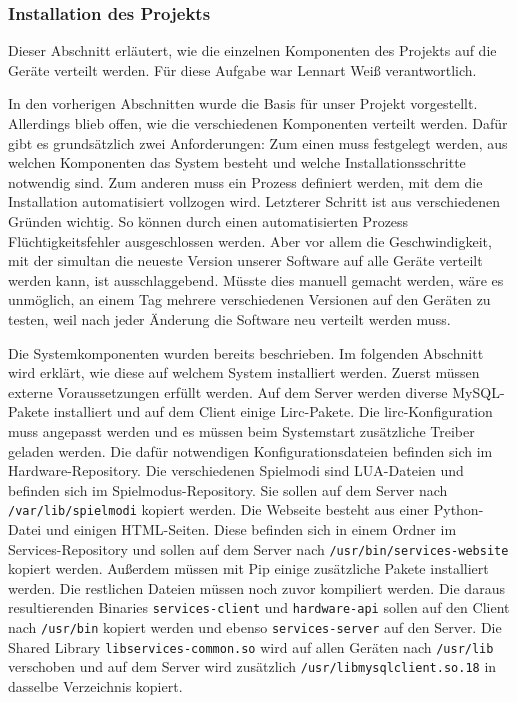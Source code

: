 \subsubsection{Installation des Projekts}
\label{sec:installation-des-projekts}

Dieser Abschnitt erläutert, wie die einzelnen Komponenten des Projekts auf die
Geräte verteilt werden. Für diese Aufgabe war Lennart Weiß verantwortlich.

In den vorherigen Abschnitten wurde die Basis für unser Projekt vorgestellt.
Allerdings blieb offen, wie die verschiedenen Komponenten verteilt werden.
Dafür gibt es grundsätzlich zwei Anforderungen: Zum einen muss festgelegt
werden, aus welchen Komponenten das System besteht und welche Installationsschritte
notwendig sind. Zum anderen muss ein Prozess definiert werden, mit dem
die Installation automatisiert vollzogen wird. Letzterer Schritt ist aus
verschiedenen Gründen wichtig. So können durch einen automatisierten
Prozess Flüchtigkeitsfehler ausgeschlossen werden. Aber vor allem die Geschwindigkeit,
mit der simultan die neueste Version unserer Software auf alle Geräte verteilt
werden kann, ist ausschlaggebend. Müsste dies manuell gemacht werden, wäre es
unmöglich, an einem Tag mehrere verschiedenen Versionen auf den Geräten zu
testen, weil nach jeder Änderung die Software neu verteilt werden muss.

Die Systemkomponenten wurden bereits beschrieben. Im folgenden Abschnitt wird
erklärt, wie diese auf welchem System installiert werden. Zuerst müssen externe
Voraussetzungen erfüllt werden. Auf dem Server werden diverse MySQL-Pakete
installiert und auf dem Client einige Lirc-Pakete. Die lirc-Konfiguration muss
angepasst werden und es müssen beim Systemstart zusätzliche Treiber geladen
werden. Die dafür notwendigen Konfigurationsdateien befinden sich im Hardware-Repository.
Die verschiedenen Spielmodi sind LUA-Dateien und befinden sich
im Spielmodus-Repository. Sie sollen auf dem Server nach 
\texttt{/var/lib/spielmodi} kopiert werden. Die Webseite besteht aus einer
Python-Datei und einigen HTML-Seiten. Diese befinden sich in einem Ordner im
Services-Repository und sollen auf dem Server nach 
\texttt{/usr/bin/services-website} kopiert werden. Außerdem müssen mit Pip
einige zusätzliche Pakete installiert werden. Die restlichen Dateien
müssen noch zuvor kompiliert werden. Die daraus resultierenden Binaries 
\texttt{services-client} und \texttt{hardware-api} sollen auf den Client nach
\texttt{/usr/bin} kopiert werden und ebenso \texttt{services-server} auf
den Server. Die Shared Library \texttt{libservices-common.so} wird auf allen
Geräten nach \texttt{/usr/lib} verschoben und auf dem Server wird zusätzlich
\texttt{/usr/libmysqlclient.so.18} in dasselbe Verzeichnis kopiert.

